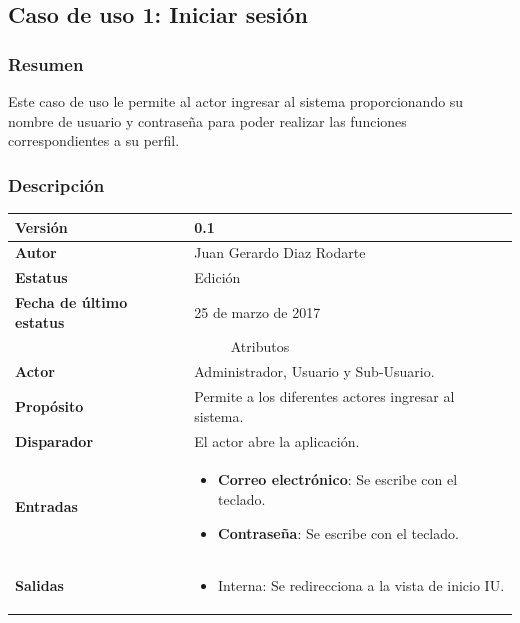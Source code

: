 \subsection{Caso de uso 1: Iniciar sesión} \label{cu1}
\subsubsection{Resumen}
Este caso de uso le permite al actor ingresar al sistema proporcionando su nombre de usuario y contraseña para poder realizar las funciones correspondientes a su perfil.
\subsubsection{Descripción}
\begingroup
\setlength{\LTleft}{-10cm plus -1fill}
\setlength{\LTright}{\LTleft}
\begin{center}  
   \label{tab:cu1_tab}
  \begin{longtable}{| p{3.5cm} | p{11.5cm} |}
      	\hline
      		\textbf{Versión} &  0.1 \\
        \hline 
       		\textbf{Autor} & Juan Gerardo Diaz Rodarte\\
        \hline
          \textbf{Estatus} & Edición \\
        \hline  
          \textbf{Fecha de último estatus} & 25 de marzo de 2017 \\
        \hline
      \multicolumn{2}{|c|}{\large{Atributos}} \\
        \hline
          \textbf{Actor}  & Administrador, Usuario y Sub-Usuario. \\
        \hline	
          \textbf{Propósito} & Permite a los diferentes actores ingresar al sistema. \\
        \hline
          \textbf{Disparador} & El actor abre la aplicación. \\
        \hline	
          \textbf{Entradas} & 
            \begin{itemize}
              \item \textbf{Correo electrónico}: Se escribe con el teclado.
              \item \textbf{Contraseña}: Se escribe con el teclado.
            \end{itemize} \\
        \hline	
          \textbf{Salidas} & 
            \begin{itemize}
              \item Interna: Se redirecciona a la vista de inicio IU.

\end{itemize}
\end{longtable}
\end{center}
